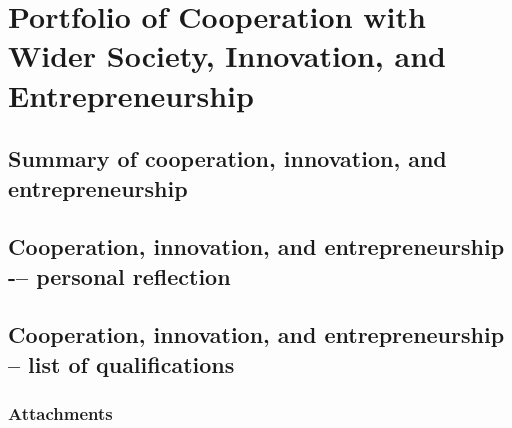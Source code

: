 \chapter{Portfolio of Cooperation with Wider Society, Innovation, and Entrepreneurship}

\section{Summary of cooperation, innovation, and entrepreneurship}

\section{Cooperation, innovation, and entrepreneurship -– personal reflection}

\section{Cooperation, innovation, and entrepreneurship – list of qualifications}

\subsection{Attachments}

